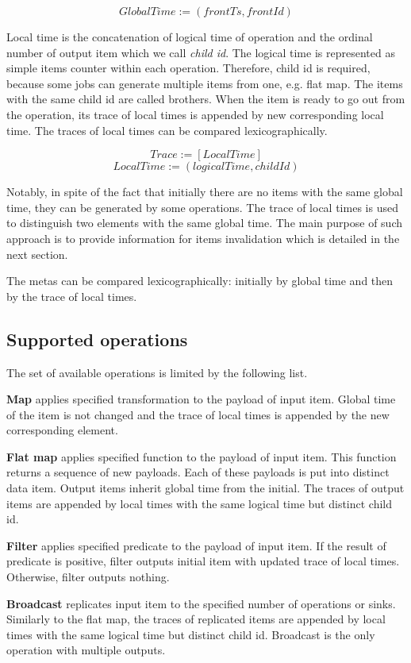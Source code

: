 \[GlobalTime := (frontTs, frontId)\]

Local time is the concatenation of logical time of operation and the ordinal number of output item which we call {\it child id}. The logical time is represented as simple items counter within each operation. Therefore, child id is required, because some jobs can generate multiple items from one, e.g. flat map. The items with the same child id are called {\lt brothers}. When the item is ready to go out from the operation, its trace of local times is appended by new corresponding local time. The traces of local times can be compared lexicographically.

\[Trace := [LocalTime]\]
\[LocalTime := (logicalTime, childId)\]

Notably, in spite of the fact that initially there are no items with the same global time, they can be generated by some operations. The trace of local times is used to distinguish two elements with the same global time. The main purpose of such approach is to provide information for items invalidation which is detailed in the next section.

The metas can be compared lexicographically: initially by global time and then by the trace of local times.

\subsection{Supported operations}
The set of available operations is limited by the following list.

{\bf Map} applies specified transformation to the payload of input item. Global time of the item is not changed and the trace of local times is appended by the new corresponding element.

{\bf Flat map} applies specified function to the payload of input item. This function returns a sequence of new payloads. Each of these payloads is put into distinct data item. Output items inherit global time from the initial. The traces of output items are appended by local times with the same logical time but distinct child id.

{\bf Filter} applies specified predicate to the payload of input item. If the result of predicate is positive, filter outputs initial item with updated trace of local times. Otherwise, filter outputs nothing.

{\bf Broadcast} replicates input item to the specified number of operations or sinks. Similarly to the flat map, the traces of replicated items are appended by local times with the same logical time but distinct child id. Broadcast is the only operation with multiple outputs.


